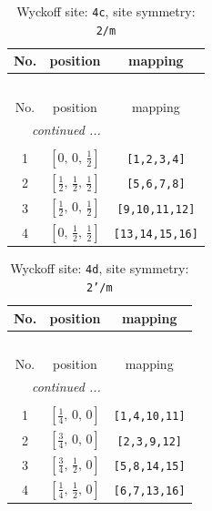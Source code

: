 \documentclass[fleqn,8pt]{jsarticle}
\begin{document}
\renewcommand{\arraystretch}{1.2}
\begin{longtable}{ccc}
\caption{Wyckoff site: {\tt 4c}, site symmetry: {\tt 2/m}}
 \\
 \hline \hline
No. & position & mapping \\ \hline \endfirsthead

\multicolumn{2}{l}{\tablename\ \thetable{}} \\
 \hline \hline
No. & position & mapping \\ \hline \endhead

 \hline \hline
\multicolumn{2}{r}{\footnotesize\it continued ...} \\ \endfoot

 \hline \hline
\multicolumn{2}{r}{} \\ \endlastfoot

1 & $\left[ 0,\, 0,\, \frac{1}{2} \right]$ & {\tt [1,2,3,4]} \\ \hline
2 & $\left[ \frac{1}{2},\, \frac{1}{2},\, \frac{1}{2} \right]$ & {\tt [5,6,7,8]} \\ \hline
3 & $\left[ \frac{1}{2},\, 0,\, \frac{1}{2} \right]$ & {\tt [9,10,11,12]} \\ \hline
4 & $\left[ 0,\, \frac{1}{2},\, \frac{1}{2} \right]$ & {\tt [13,14,15,16]} \\
\end{longtable}
\renewcommand{\arraystretch}{1.2}
\begin{longtable}{ccc}
\caption{Wyckoff site: {\tt 4d}, site symmetry: {\tt 2'/m}}
 \\
 \hline \hline
No. & position & mapping \\ \hline \endfirsthead

\multicolumn{2}{l}{\tablename\ \thetable{}} \\
 \hline \hline
No. & position & mapping \\ \hline \endhead

 \hline \hline
\multicolumn{2}{r}{\footnotesize\it continued ...} \\ \endfoot

 \hline \hline
\multicolumn{2}{r}{} \\ \endlastfoot

1 & $\left[ \frac{1}{4},\, 0,\, 0 \right]$ & {\tt [1,4,10,11]} \\ \hline
2 & $\left[ \frac{3}{4},\, 0,\, 0 \right]$ & {\tt [2,3,9,12]} \\ \hline
3 & $\left[ \frac{3}{4},\, \frac{1}{2},\, 0 \right]$ & {\tt [5,8,14,15]} \\ \hline
4 & $\left[ \frac{1}{4},\, \frac{1}{2},\, 0 \right]$ & {\tt [6,7,13,16]} \\
\end{longtable}
\end{document}
